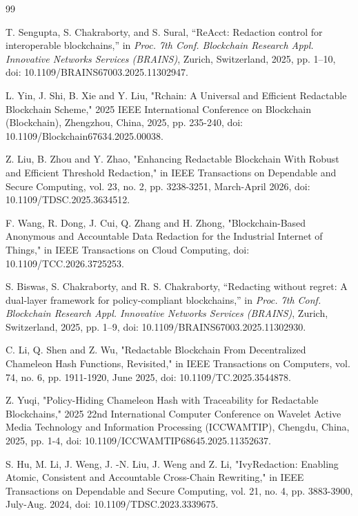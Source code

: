 \documentclass[lettersize,journal]{IEEEtran}
\begin{document}
\begin{thebibliography}{99}
    
    T. Sengupta, S. Chakraborty, and S. Sural,
    ``ReAcct: Redaction control for interoperable blockchains,''
    in \textit{Proc. 7th Conf. Blockchain Research Appl. Innovative
    Networks Services (BRAINS)}, Zurich, Switzerland, 2025,
    pp. 1--10, doi: 10.1109/BRAINS67003.2025.11302947.
    
    L. Yin, J. Shi, B. Xie and Y. Liu, "Rchain: A Universal and Efficient Redactable Blockchain Scheme," 2025 IEEE International Conference on Blockchain (Blockchain), Zhengzhou, China, 2025, pp. 235-240, doi: 10.1109/Blockchain67634.2025.00038.
    
    Z. Liu, B. Zhou and Y. Zhao, "Enhancing Redactable Blockchain With Robust and Efficient Threshold Redaction," in IEEE Transactions on Dependable and Secure Computing, vol. 23, no. 2, pp. 3238-3251, March-April 2026, doi: 10.1109/TDSC.2025.3634512.
    
    F. Wang, R. Dong, J. Cui, Q. Zhang and H. Zhong, "Blockchain-Based Anonymous and Accountable Data Redaction for the Industrial Internet of Things," in IEEE Transactions on Cloud Computing, doi: 10.1109/TCC.2026.3725253.
    
    S. Biswas, S. Chakraborty, and R. S. Chakraborty,
    ``Redacting without regret: A dual-layer framework for
    policy-compliant blockchains,''
    in \textit{Proc. 7th Conf. Blockchain Research Appl. Innovative
    Networks Services (BRAINS)}, Zurich, Switzerland, 2025,
    pp. 1--9, doi: 10.1109/BRAINS67003.2025.11302930.
    
    C. Li, Q. Shen and Z. Wu, "Redactable Blockchain From Decentralized Chameleon Hash Functions, Revisited," in IEEE Transactions on Computers, vol. 74, no. 6, pp. 1911-1920, June 2025, doi: 10.1109/TC.2025.3544878.
    
    Z. Yuqi, "Policy-Hiding Chameleon Hash with Traceability for Redactable Blockchains," 2025 22nd International Computer Conference on Wavelet Active Media Technology and Information Processing (ICCWAMTIP), Chengdu, China, 2025, pp. 1-4, doi: 10.1109/ICCWAMTIP68645.2025.11352637.
    
    S. Hu, M. Li, J. Weng, J. -N. Liu, J. Weng and Z. Li, "IvyRedaction: Enabling Atomic, Consistent and Accountable Cross-Chain Rewriting," in IEEE Transactions on Dependable and Secure Computing, vol. 21, no. 4, pp. 3883-3900, July-Aug. 2024, doi: 10.1109/TDSC.2023.3339675.
    

\end{thebibliography}
\end{document}
